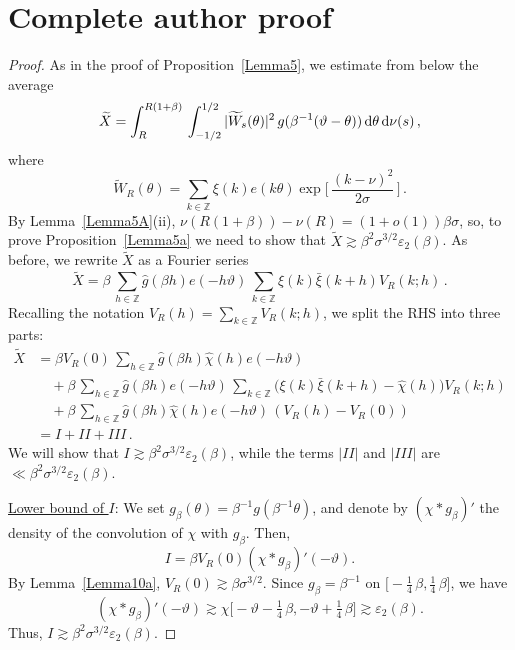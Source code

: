 \documentclass[10pt,a4paper]{amsart}
\newcommand{\bZ}{\mathbb Z}
\def\ep{{\varepsilon}}
\begin{document}
\section*{Complete author proof}
\begin{proof}
As in the proof of Proposition~\ref{Lemma5}, we estimate from below the average
\[
\widetilde{X} =
\int_R^{R(1+\beta)}\, \int_{-1/2}^{1/2} |\widetilde{W}_s(\theta)|^2\,
g(\beta^{-1}(\vartheta-\theta))\, {\rm d}\theta\, {\rm d}\nu (s)\,,
\]
where
\[
\widetilde{W}_R(\theta) = \sum_{k\in\bZ} \xi(k)e(k\theta)
\exp\bigl[\,\frac{(k-\nu)^2}{2\sigma} \,\bigr]\,.
\]
By Lemma~\ref{Lemma5A}(ii), $\nu(R(1+\beta))-\nu(R) = (1+o(1))\beta\sigma$, so, to prove Proposition~\ref{Lemma5a} we need to show that
$\widetilde{X} \gtrsim \beta^2\sigma^{3/2}\ep_2(\beta)$.
As before, we rewrite $\widetilde X$ as a Fourier series
\[
\widetilde{X}
= \beta\,
\sum_{h\in\bZ} \widehat{g}(\beta h) e(-h\vartheta)\,
\sum_{k\in\bZ} \xi(k)\bar\xi(k+h) V_R(k; h)\,.
\]
Recalling the notation
$\displaystyle V_R(h) = \sum_{k\in\bZ} V_R(k; h)$, we split the RHS into three parts:
\begin{align*}
\widetilde{X}  &= \beta V_R(0)\, \sum_{h\in\bZ} \widehat{g}(\beta h)\widehat{\chi}(h) e(-h\vartheta) \\
&\quad + \beta\, \sum_{h\in\bZ} \widehat{g}(\beta h) e(-h\vartheta)\,
\sum_{k\in\bZ} \bigl( \xi(k)\bar\xi(k+h) - \widehat{\chi}(h) \bigr) V_R(k; h) \\
&\quad + \beta\, \sum_{h\in\bZ} \widehat{g}(\beta h) \widehat{\chi}(h) e(-h\vartheta)\,
(V_R(h) - V_R(0)) \\
&= I +II + III\,.
\end{align*}
We will show that $I\gtrsim \beta^2\sigma^{3/2}\ep_2(\beta)$, while
the terms $|II|$ and $|III|$ are  $\ll \beta^2\sigma^{3/2}\ep_2(\beta)$.

\medskip\noindent\underline{Lower bound of $I$}:
We set $g_\beta(\theta) = \beta^{-1}g(\beta^{-1}\theta)$, and denote by
$(\chi * g_\beta)'$ the density of the convolution of $\chi$ with
$g_\beta$. Then, \[ I=\beta V_R(0) (\chi * g_\beta)'(-\vartheta).\]
By Lemma~\ref{Lemma10a}, $V_R(0)\gtrsim \beta \sigma^{3/2}$. Since $g_\beta = \beta^{-1}$ on
$ \bigl[-\tfrac14\, \beta, \tfrac14\, \beta \bigr]$, we have
\[
(\chi * g_\beta)'(-\vartheta) \gtrsim
\chi\bigl[-\vartheta-\tfrac14\, \beta, -\vartheta + \tfrac14\, \beta \bigr]
\gtrsim \ep_2(\beta).
\]
Thus, $I \gtrsim \beta^2 \sigma^{3/2} \ep_2(\beta)$.


\end{proof}
\end{document}
